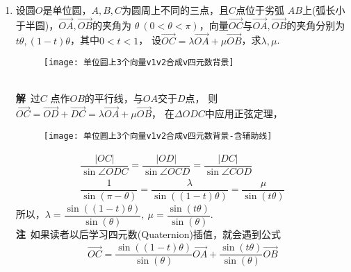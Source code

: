 \begin{enumerate}[label={【\textbf{例\thechapter.\arabic*}】},
 leftmargin=\inteval{\myenumleftmargin}pt,
 itemsep=\inteval{\myenumitempsep}pt,
 itemindent=\inteval{\myenumitemindent}pt]
\item 设圆$ O $是单位圆，$ A,B,C $为圆周上不同的三点，且$ C $点位于劣弧
$ AB $上(弧长小于半圆)，$ \vec{OA},\vec{OB} $的夹角为
$ \theta\ (0<\theta<\pi) $，向量$\vec{OC}$与$ \vec{OA},
\vec{OB} $的夹角分别为$ t\theta,(1-t)\theta $，其中$ 0<t<1 $，
设$ \vec{OC}=\lambda\vec{OA}+\mu\vec{OB} $，求$ \lambda,\mu $.
\begin{figure}[h]
    \centering
    \texttt{[image: 单位圆上3个向量v1v2合成v四元数背景]}
\end{figure} \\
\textbf{解}\ 过$ C $ 点作$ OB $的平行线，与$ OA $交于$ D $点，
则$ \vec{OC}=\vec{OD}+\vec{DC}=\lambda\vec{OA}+\mu\vec{OB} $，
在$ \Delta ODC $中应用正弦定理，
\begin{figure}[h]
    \centering
    \texttt{[image: 单位圆上3个向量v1v2合成v四元数背景-含辅助线]}
    \label{单位圆上3个向量v1v2合成v}
\end{figure}
\begin{gather*}
    \dfrac{|OC|}{\sin\angle ODC}=\dfrac{|OD|}{\sin\angle OCD}
    =\dfrac{|DC|}{\sin\angle COD} \\
    \dfrac{1}{\sin(\pi-\theta)}=
    \dfrac{\lambda}{\sin((1-t)\theta)}=
    \dfrac{\mu}{\sin(t\theta)}
\end{gather*}
所以，$ \lambda=\dfrac{\sin((1-t)\theta)}{\sin(\theta)},\ 
\mu=\dfrac{\sin(t\theta)}{\sin(\theta)} $. \\
\textbf{注}\ 如果读者以后学习四元数(Quaternion)插值，就会遇到公式
\begin{gather*}\label{四元数插值}
    \vec{OC}=\dfrac{\sin((1-t)\theta)}{\sin(\theta)}
    \vec{OA}+\dfrac{\sin(t\theta)}{\sin(\theta)}\vec{OB} 
\end{gather*}


\end{enumerate}
